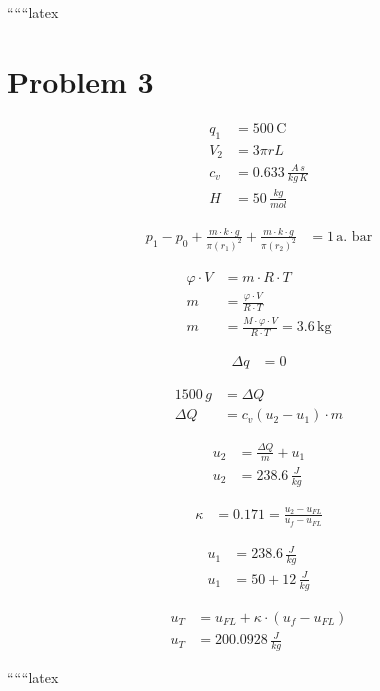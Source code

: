 
``````latex


\section*{Problem 3}

\begin{align*}
q_1 &= 500 \, \text{C} \\
V_2 &= 3 \pi r L \\
c_v &= 0.633 \, \frac{A \, s}{kg \, K} \\
H &= 50 \, \frac{kg}{mol}
\end{align*}

\begin{align*}
p_1 - p_0 + \frac{m \cdot k \cdot g}{\pi (r_1)^2} + \frac{m \cdot k \cdot g}{\pi (r_2)^2} &= 1 \, \text{a. bar}
\end{align*}

\begin{align*}
\varphi \cdot V &= m \cdot R \cdot T \\
m &= \frac{\varphi \cdot V}{R \cdot T} \\
m &= \frac{M \cdot \varphi \cdot V}{R \cdot T} = 3.6 \, \text{kg}
\end{align*}

\begin{align*}
\Delta q &= 0
\end{align*}

\begin{align*}
1500 \, g &= \Delta Q \\
\Delta Q &= c_v (u_2 - u_1) \cdot m
\end{align*}

\begin{align*}
u_2 &= \frac{\Delta Q}{m} + u_1 \\
u_2 &= 238.6 \, \frac{J}{kg}
\end{align*}

\begin{align*}
\kappa &= 0.171 = \frac{u_2 - u_{FL}}{u_f - u_{FL}}
\end{align*}

\begin{align*}
u_1 &= 238.6 \, \frac{J}{kg} \\
u_1 &= 50 + 12 \, \frac{J}{kg}
\end{align*}

\begin{align*}
u_T &= u_{FL} + \kappa \cdot (u_f - u_{FL}) \\
u_T &= 200.0928 \, \frac{J}{kg}
\end{align*}

``````latex


